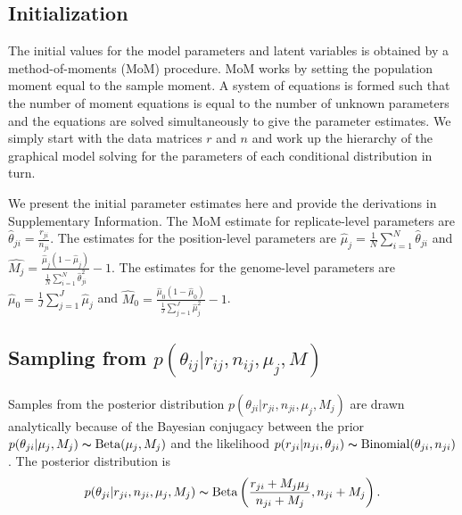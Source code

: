 \documentclass{bioinfo}
\begin{document}
\subsection{Initialization}
The initial values for the model parameters and latent variables is obtained by a method-of-moments (MoM) procedure. MoM works by setting the population moment equal to the sample moment. A system of equations is formed such that the number of moment equations is equal to the number of unknown parameters and the equations are solved simultaneously to give the parameter estimates. We simply start with the data matrices $r$ and $n$ and work up the hierarchy of the graphical model solving for the parameters of each conditional distribution in turn.

We present the initial parameter estimates here and provide the derivations in Supplementary Information. The MoM estimate for replicate-level parameters are
$\hat{\theta}_{ji} = \frac{r_{ji}} {n_{ji}}$.
The estimates for the position-level parameters are
$\hat{\mu}_j = \frac{1}{N} \sum_{i=1}^N \hat{\theta}_{ji}$
and
$\hat{M_j} = \frac{ \hat{\mu}_j (1 - \hat{\mu}_j ) } { \frac{1}{N} \sum_{i=1}^N \hat{\theta}_{ji}^2 } -1$.
The estimates for the genome-level parameters are
$\hat{\mu}_0 = \frac{1}{J} \sum_{j=1}^J \hat{\mu}_j$
and
$\hat{M}_0 = \frac{ \hat{\mu}_0 (1 - \hat{\mu}_0 ) } {\frac{1}{J} \sum_{j=1}^J \hat{\mu}_j^2 } -1$.

\subsection{Sampling from $p \left( \theta_{ij} |r_{ij},n_{ij},\mu_j,M \right)$}
Samples from the posterior distribution
$p(\theta_{ji} | r_{ji}, n_{ji}, \mu_j, M_j)$
are drawn analytically because of the Bayesian conjugacy between the prior
$p(\theta_{ji} | \mu_j, M_j) \thicksim \text{Beta}(\mu_j, M_j)$
and the likelihood
$p(r_{ji} | n_{ji}, \theta_{ji}) \thicksim \text{Binomial}(\theta_{ji}, n_{ji})$.
The posterior distribution is
\begin{equation}
	p(\theta_{ji} | r_{ji}, n_{ji}, \mu_j, M_j) \thicksim \text{Beta}\left( \frac{r_{ji} + M_j \mu_j}{n_{ji} + M_j} , n_{ji} + M_j\right).
\end{equation}
\end{document}
